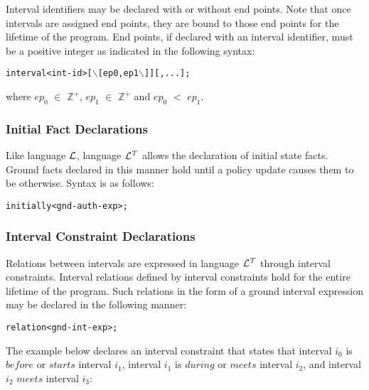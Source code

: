 \documentclass[11pt]{report}
\newenvironment{vverbatim}
{
  \begin{alltt}
}
{
    \vspace{-\baselineskip}
  \end{alltt}
}
\begin{document}
          Interval identifiers may be declared with or without end points. Note
          that once intervals are assigned end points, they are bound to those
          end points for the lifetime of the program. End points, if declared
          with an interval identifier, must be a positive integer as indicated
          in the following syntax:

          \begin{vverbatim}
  interval <int-id> [\(\backslash\)[ep0, ep1\(\backslash\)]][, ... ];
          \end{vverbatim}

          \noindent
          where $ep_0$ $\in$ ${\mathbb Z}^+$, $ep_1$ $\in$ ${\mathbb Z}^+$ and
          $ep_0$ $<$ $ep_1$.

        \subsubsection{Initial Fact Declarations}

          Like language ${\cal L}$, language ${\cal L^T}$ allows the
          declaration of initial state facts. Ground facts declared in this
          manner hold until a policy update causes them to be otherwise. Syntax
          is as follows:

          \begin{vverbatim}
  initially <gnd-auth-exp>;
          \end{vverbatim}

        \subsubsection{Interval Constraint Declarations}

          Relations between intervals are expressed in language ${\cal L^T}$
          through interval constraints. Interval relations defined by interval
          constraints hold for the entire lifetime of the program. Such
          relations in the form of a ground interval expression may be declared
          in the following manner:

          \begin{vverbatim}
  relation <gnd-int-exp>;
          \end{vverbatim}

          The example below declares an interval constraint that states that
          interval $i_0$ is $before$ or $starts$ interval $i_1$, interval $i_1$
          is $during$ or $meets$ interval $i_2$, and interval $i_2$ $meets$
          interval $i_3$:
\end{document}
